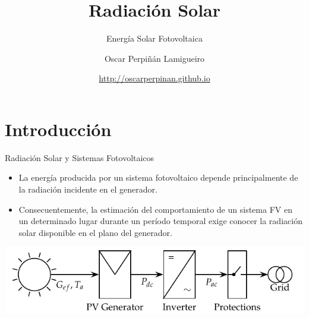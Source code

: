 \documentclass[xcolor={usenames,svgnames,dvipsnames}]{beamer}
\author{Oscar Perpiñán Lamigueiro}
\date{\url{http://oscarperpinan.github.io}}
\title{Radiación Solar}
\subtitle{Energía Solar Fotovoltaica}
\begin{document}
\maketitle

\section{Introducción}
\label{sec:orgf284eaf}

\begin{frame}[label={sec:orge883e5b}]{Radiación Solar y Sistemas Fotovoltaicos}
\begin{itemize}
\item La \alert{energía producida} por un sistema fotovoltaico depende principalmente de la \alert{radiación incidente} en el generador.

\item Consecuentemente, la \alert{estimación del comportamiento} de un sistema FV en un determinado lugar durante un período temporal exige \alert{conocer la radiación solar disponible en el plano del generador}.
\end{itemize}

\begin{center}
\includegraphics[width=.9\linewidth]{../figs/GCPVScheme.pdf}
\end{center}
\end{frame}
\end{document}
